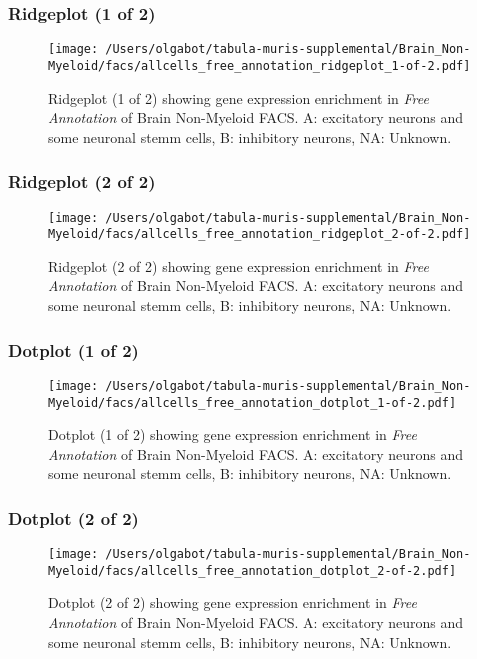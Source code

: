 \clearpage
\subsubsection{Ridgeplot (1 of 2)}
\begin{figure}[h]
\centering
\texttt{[image: /Users/olgabot/tabula-muris-supplemental/Brain\_Non-Myeloid/facs/allcells\_free\_annotation\_ridgeplot\_1-of-2.pdf]}

\caption{ Ridgeplot (1 of 2)  showing gene expression enrichment in \emph{Free Annotation} of Brain Non-Myeloid FACS. A: excitatory neurons and some neuronal stemm cells, B: inhibitory neurons, NA: Unknown.}
\end{figure}


\clearpage
\subsubsection{Ridgeplot (2 of 2)}
\begin{figure}[h]
\centering
\texttt{[image: /Users/olgabot/tabula-muris-supplemental/Brain\_Non-Myeloid/facs/allcells\_free\_annotation\_ridgeplot\_2-of-2.pdf]}

\caption{ Ridgeplot (2 of 2)  showing gene expression enrichment in \emph{Free Annotation} of Brain Non-Myeloid FACS. A: excitatory neurons and some neuronal stemm cells, B: inhibitory neurons, NA: Unknown.}
\end{figure}


\clearpage
\subsubsection{Dotplot (1 of 2)}
\begin{figure}[h]
\centering
\texttt{[image: /Users/olgabot/tabula-muris-supplemental/Brain\_Non-Myeloid/facs/allcells\_free\_annotation\_dotplot\_1-of-2.pdf]}

\caption{ Dotplot (1 of 2)  showing gene expression enrichment in \emph{Free Annotation} of Brain Non-Myeloid FACS. A: excitatory neurons and some neuronal stemm cells, B: inhibitory neurons, NA: Unknown.}
\end{figure}


\clearpage
\subsubsection{Dotplot (2 of 2)}
\begin{figure}[h]
\centering
\texttt{[image: /Users/olgabot/tabula-muris-supplemental/Brain\_Non-Myeloid/facs/allcells\_free\_annotation\_dotplot\_2-of-2.pdf]}

\caption{ Dotplot (2 of 2)  showing gene expression enrichment in \emph{Free Annotation} of Brain Non-Myeloid FACS. A: excitatory neurons and some neuronal stemm cells, B: inhibitory neurons, NA: Unknown.}
\end{figure}


